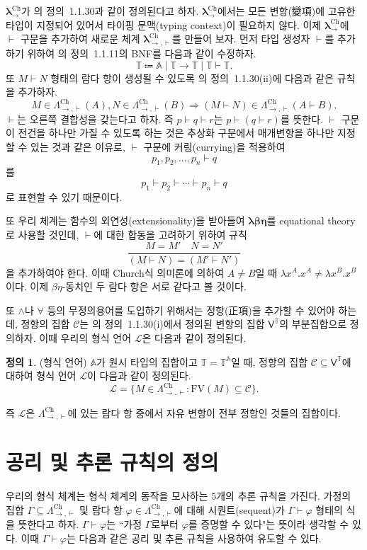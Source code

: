 \documentclass[10pt,twocolumn]{article}
\theoremstyle{definition}
\newtheorem{definition}[theorem]{정의}
\newcommand{\lch}{\bm\lambda_\to^{\text{Ch}}}
\newcommand{\lchh}{\bm\lambda_{\to,\vdash}^{\text{Ch}}}
\newcommand{\Lchh}{\Lambda_{\to,\vdash}^{\text{Ch}}}
\begin{document}
$\lch$가 \cite{luswt}의 정의~1.1.30과 같이 정의된다고 하자. $\lch$에서는 모든 변항(變項)에 고유한 타입이 지정되어 있어서 타이핑 문맥(typing context)이 필요하지 않다. 이제 $\lch$에 $\vdash$ 구문을 추가하여 새로운 체계 $\lchh$를 만들어 보자. 먼저 타입 생성자 $\vdash$를 추가하기 위하여 \cite{luswt}의 정의~1.1.11의 BNF를 다음과 같이 수정하자.
$$\mathds T \Coloneqq \mathbb A\mid\mathds T\to\mathds T\mid\mathds T\vdash\mathds T.$$
또 $M\vdash N$ 형태의 람다 항이 생성될 수 있도록 \cite{luswt}의 정의~1.1.30(ii)에 다음과 같은 규칙을 추가하자.
$$M\in\Lchh(A), N\in\Lchh(B)\Rightarrow (M\vdash N)\in\Lchh(A\vdash B).$$
$\vdash$는 오른쪽 결합성을 갖는다고 하자. 즉 $p\vdash q\vdash r$는 $p\vdash (q\vdash r)$를 뜻한다. $\vdash$ 구문이 전건을 하나만 가질 수 있도록 하는 것은 추상화 구문에서 매개변항을 하나만 지정할 수 있는 것과 같은 이유로, $\vdash$ 구문에 커링(currying)을 적용하여
$$p_1, p_2, \ldots, p_n\vdash q$$
를
$$p_1 \vdash p_2\vdash\cdots\vdash p_n\vdash q$$
로 표현할 수 있기 때문이다.

또 우리 체계는 함수의 외연성(extensionality)을 받아들여 $\bm{\lambda\beta\eta}$를 equational theory로 사용할 것인데, $\vdash$에 대한 합동을 고려하기 위하여 규칙
$$\dfrac{M=M'\quad N=N'}{(M\vdash N)=(M'\vdash N')}$$
을 추가하여야 한다. 이때 Church식 의미론에 의하여 $A\ne B$일 때 $\lambda x^A.x^A\ne\lambda x^B.x^B$이다. 이제 $\beta\eta$-동치인 두 람다 항은 서로 같다고 볼 것이다.

또 $\land$나 $\forall$ 등의 무정의용어를 도입하기 위해서는 정항(正項)을 추가할 수 있어야 하는데, 정항의 집합 $\mathcal C$는 \cite{luswt}의 정의~1.1.30(i)에서 정의된 변항의 집합 $\mathsf V^{\mathds T}$의 부분집합으로 정의하자. 이때 우리의 형식 언어 $\mathcal L$은 다음과 같이 정의된다.

\begin{definition}(형식 언어)
	$\mathbb A$가 원시 타입의 집합이고 $\mathds T = \mathds T^{\mathbb A}$일 때, 정항의 집합 $\mathcal C\subseteq \mathsf V^{\mathds T}$에 대하여 형식 언어 $\mathcal L$이 다음과 같이 정의된다.
	$$\mathcal L = \{M\in\Lchh: \mathrm{FV}(M)\subseteq\mathcal C\}.$$
\end{definition}

즉 $\mathcal L$은 $\Lchh$에 있는 람다 항 중에서 자유 변항이 전부 정항인 것들의 집합이다.

\section{공리 및 추론 규칙의 정의}

우리의 형식 체계는 형식 체계의 동작을 모사하는 5개의 추론 규칙을 가진다. 가정의 집합 $\Gamma\subseteq\Lchh$ 및 람다 항 $\varphi\in\Lchh$에 대해 시퀀트(sequent)가 $\Gamma\vdash\varphi$ 형태의 식을 뜻한다고 하자. $\Gamma\vdash\varphi$는 ``가정 $\Gamma$로부터 $\varphi$를 증명할 수 있다"는 뜻이라 생각할 수 있다. 이때 $\Gamma\vdash\varphi$는 다음과 같은 공리 및 추론 규칙을 사용하여 유도할 수 있다.
\end{document}

